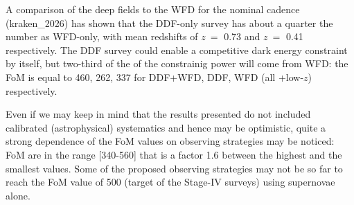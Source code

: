 A comparison of the deep fields to the WFD for the nominal cadence (kraken\_2026) has shown that the DDF-only survey has about a quarter the number as WFD-only, with mean redshifts of $z~=$ 0.73 and  $z~=$ 0.41 respectively. The DDF survey could enable a competitive dark energy constraint by itself, but two-third of the of the constrainig power will come from WFD: the FoM is equal to 460, 262, 337 for DDF+WFD, DDF, WFD (all +low-$z$) respectively.


Even if we may keep in mind that the results presented do not included calibrated (astrophysical) systematics and hence may be optimistic, quite a strong dependence of the FoM values on observing strategies may be noticed: FoM are in the range [340-560] that is a factor 1.6 between the highest and the smallest values. Some of the proposed observing strategies may not be so far to reach the FoM value of 500 (target of the Stage-IV surveys) using supernovae alone.
